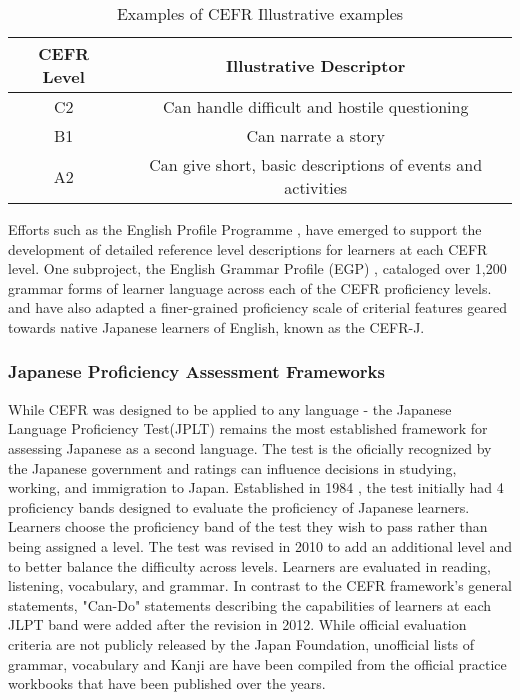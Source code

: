 \begin{table}
\centering
\begin{tabular}{cc}
\hline \textbf{CEFR Level} & \textbf{Illustrative Descriptor} \\ \hline
C2 & Can handle difficult and hostile questioning \\
B1  & Can narrate a story \\
A2 & Can give short, basic descriptions of events and activities \\
\hline
\end{tabular}
\caption{\label{tab:cefr-descriptors} Examples of CEFR Illustrative examples}
\end{table}

Efforts such
as the English Profile Programme \citep{Saville2010}, have emerged to support the development of detailed reference
level
descriptions
for learners at each CEFR level. One subproject, the English Grammar Profile (EGP) \citep{okeeffe2017},
cataloged over 1,200 grammar forms of learner language across each of the CEFR proficiency levels.
\citet{tono2018} and \citet{ishii2016} have
also adapted a
finer-grained
proficiency scale
of criterial features
geared
towards native Japanese learners of English, known as the CEFR-J.

\citep{POLKE}

\subsubsection{Japanese Proficiency Assessment Frameworks}
While CEFR was designed to be applied to any language - the Japanese Language Proficiency Test(JPLT) remains the
most established framework for assessing Japanese as a second language. The test is the oficially
recognized by the Japanese government and ratings can influence decisions in studying, working, and immigration to
Japan.  
Established in
1984
\citet{JLPTinfo}, the
test initially had 4
proficiency bands
designed to evaluate the proficiency of Japanese learners. Learners choose the proficiency band of the test they
wish to pass rather than being assigned a level. The test was revised in 2010 to add an additional level and to
better balance the difficulty across levels. Learners are evaluated in reading, listening,
vocabulary, and grammar. In contrast to the CEFR framework's general statements,
"Can-Do" statements describing the
capabilities of
learners at
each
JLPT band were added after the revision in 2012. While official evaluation criteria are not publicly released by the
Japan
Foundation,
unofficial lists of grammar, vocabulary and Kanji are have been compiled from the official practice workbooks that
have been published over the years.

